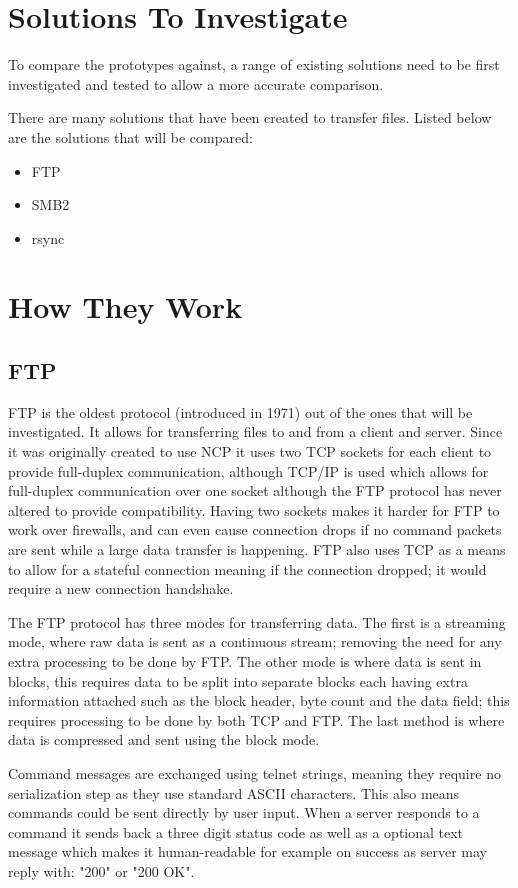 \section{Solutions To Investigate}
To compare the prototypes against, a range of existing solutions need to be first investigated and tested to allow a more accurate comparison.

There are many solutions that have been created to transfer files. Listed below are the solutions that will be compared:

\begin{itemize}
	\item FTP
	\item SMB2
	\item rsync
\end{itemize}


\section{How They Work}
\subsection*{FTP}
FTP is the oldest protocol (introduced in 1971) out of the ones that will be investigated. It allows for transferring files to and from a client and server. Since it was originally created to use NCP it uses two TCP sockets for each client to provide full-duplex communication, although TCP/IP is used which allows for full-duplex communication over one socket although the FTP protocol has never altered to provide compatibility. Having two sockets makes it harder for FTP to work over firewalls, and can even cause connection drops if no command packets are sent while a large data transfer is happening. FTP also uses TCP as a means to allow for a stateful connection meaning if the connection dropped; it would require a new connection handshake.

The FTP protocol has three modes for transferring data. The first is a streaming mode, where raw data is sent as a continuous stream; removing the need for any extra processing to be done by FTP. The other mode is where data is sent in blocks, this requires data to be split into separate blocks each having extra information attached such as the block header, byte count and the data field; this requires processing to be done by both TCP and FTP. The last method is where data is compressed and sent using the block mode.

Command messages are exchanged using telnet strings, meaning they require no serialization step as they use standard ASCII characters. This also means commands could be sent directly by user input. When a server responds to a command it sends back a three digit status code as well as a optional text message which makes it human-readable for example on success as server may reply with: "200" or "200 OK".

